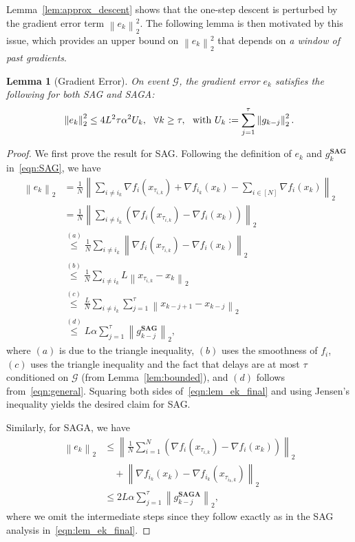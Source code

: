 \documentclass{article}
\theoremstyle{plain}
\newtheorem{lemma}[theorem]{Lemma}
\theoremstyle{definition}
\newcommand{\cG}{\mathcal{G}}
\newcommand{\norm}[1]{\left\| #1\right\|_{2}}
\newcommand{\paren}[1]{\left( #1\right)}
\begin{document}
Lemma~\ref{lem:approx_descent} shows that the one-step descent is perturbed by the gradient error term $\norm{e_k}^2$. The following lemma is then motivated by this issue, which provides an upper bound on $\norm{e_k}^2$ that depends on \textit{a window of past gradients}.
\begin{lemma}[Gradient Error]\label{lem:e_k} On event $\cG$, the gradient error $e_k$ satisfies the following for 
both SAG and SAGA:
\begin{equation}
    \norm{e_k}^2\leq 4L^2\tau\alpha^2  U_k,\ \  \forall k\geq \tau,\ \  \textup{with } U_k:=\sum_{j=1}^\tau \norm{g_{k-j}}^2.
\nonumber
\end{equation}
\end{lemma}
\begin{proof}
We first prove the result for SAG. Following the definition of $e_k$ and $g_k^\textbf{SAG}$ in~\eqref{eqn:SAG}, we have
\begin{equation}
\begin{aligned}
    \norm{e_k}&=\frac{1}{N}\norm{\sum_{i\neq i_k}\nabla f_i(x_{\tau_{i,k}})+\nabla f_{i_k}(x_k)-\sum_{i\in[N]}\nabla f_i(x_k)}\\
    &=\frac{1}{N}\norm{\sum_{i\neq i_k}\paren{\nabla f_i(x_{\tau_{i,k}})-\nabla f_i(x_k)}}\\
    &\overset{(a)}{\leq} \frac{1}{N}\sum_{i\neq i_k}\norm{\nabla f_i(x_{\tau_{i,k}})-\nabla f_i(x_k)}\\
    &\overset{(b)}{\leq} \frac{1}{N}\sum_{i\neq i_k}L\norm{x_{\tau_{i,k}}-x_k}\\
    &\overset{(c)}{\leq} \frac{L}{N}\sum_{i\neq i_k}\sum_{j=1}^{\tau}\norm{x_{k-j+1}-x_{k-j}}\\
    &\overset{(d)}{\leq} L\alpha\sum_{j=1}^{\tau}\norm{g_{k-j}^\textbf{SAG}},\label{eqn:lem_ek_final}
\end{aligned}
\end{equation}
where $(a)$ is due to the triangle inequality, $(b)$ uses the smoothness of $f_i$, $(c)$ uses the triangle inequality and the fact that delays are at most $\tau$ conditioned on $\cG$ (from Lemma~\ref{lem:bounded}), and $(d)$ follows from~\eqref{eqn:general}. Squaring both sides of~\eqref{eqn:lem_ek_final} and using Jensen's inequality yields the desired claim for SAG. 

Similarly, for SAGA, we have 
\begin{equation}
\begin{aligned}
    \norm{e_k}&\leq \norm{\frac{1}{N}\sum_{i=1}^N\paren{\nabla f_i(x_{\tau_{i,k}})-\nabla f_i(x_k)}}\\
    &\quad +\norm{\nabla f_{i_k}(x_k)-\nabla f_{i_k}(x_{\tau_{{i_k},k}})}\\
    &\leq 2L\alpha \sum_{j=1}^\tau\norm{g_{k-j}^\textbf{SAGA}},
\end{aligned}
\end{equation}
where we omit the intermediate steps since they follow exactly as in the SAG analysis in~\eqref{eqn:lem_ek_final}.
\end{proof}
\end{document}
